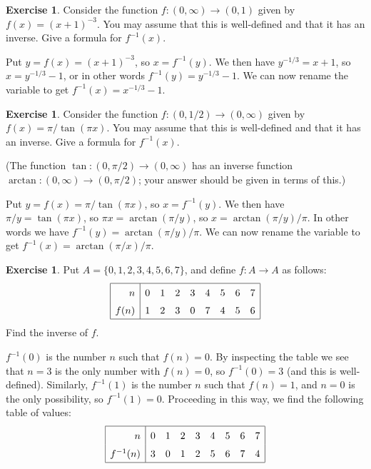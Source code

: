 \documentclass[a4paper]{book}
\newcommand{\xra}       {\xrightarrow}
\renewcommand{\:}{\colon}
\theoremstyle{definition}
\newtheorem{exercise}[theorem]{Exercise}
\renewenvironment{solution}{\SolutionInline}{\endSolutionInline}
\begin{document}
\begin{exercise}
 Consider the function $f\:(0,\infty)\xra{}(0,1)$ given by
 $f(x)=(x+1)^{-3}$.  You may assume that this is well-defined and that
 it has an inverse.  Give a formula for $f^{-1}(x)$.
\end{exercise}
\begin{solution}
 Put $y=f(x)=(x+1)^{-3}$, so $x=f^{-1}(y)$.  We then have
 $y^{-1/3}=x+1$, so $x=y^{-1/3}-1$, or in other words
 $f^{-1}(y)=y^{-1/3}-1$.  We can now rename the variable to get
 $f^{-1}(x)=x^{-1/3}-1$. 
\end{solution}
\begin{exercise}
 Consider the function $f\:(0,1/2)\xra{}(0,\infty)$ given by
 $f(x)=\pi/\tan(\pi x)$.  You may assume that this is well-defined and
 that it has an inverse.  Give a formula for $f^{-1}(x)$.

 (The function $\tan\:(0,\pi/2)\xra{}(0,\infty)$ has an inverse
 function $\arctan\:(0,\infty)\xra{}(0,\pi/2)$; your answer should be
 given in terms of this.)
\end{exercise}
\begin{solution}
 Put $y=f(x)=\pi/\tan(\pi x)$, so $x=f^{-1}(y)$.  We then have
 $\pi/y=\tan(\pi x)$, so $\pi x=\arctan(\pi/y)$, so
 $x=\arctan(\pi/y)/\pi$.  In other words we have
 $f^{-1}(y)=\arctan(\pi/y)/\pi$.  We can now rename the variable to
 get $f^{-1}(x)=\arctan(\pi/x)/\pi$.
\end{solution} 

\begin{exercise}
 Put $A=\{0,1,2,3,4,5,6,7\}$, and define $f\:A\xra{}A$ as follows:
 \[ \renewcommand{\arraystretch}{1.5} \begin{array}{|r|cccccccc|} 
   \hline
   n    & 0 & 1 & 2 & 3 & 4 & 5 & 6 & 7 \\
   f(n) & 1 & 2 & 3 & 0 & 7 & 4 & 5 & 6 \\
   \hline
 \end{array} \]
 Find the inverse of $f$.
\end{exercise}
\begin{solution}
 $f^{-1}(0)$ is the number $n$ such that $f(n)=0$.  By inspecting the
 table we see that $n=3$ is the only number with $f(n)=0$, so
 $f^{-1}(0)=3$ (and this is well-defined).  Similarly, $f^{-1}(1)$ is
 the number $n$ such that $f(n)=1$, and $n=0$ is the only possibility,
 so $f^{-1}(1)=0$.  Proceeding in this way, we find the following
 table of values:
 \[ \renewcommand{\arraystretch}{1.5} \begin{array}{|r|cccccccc|} 
   \hline
   n         & 0 & 1 & 2 & 3 & 4 & 5 & 6 & 7 \\
   f^{-1}(n) & 3 & 0 & 1 & 2 & 5 & 6 & 7 & 4 \\
   \hline
 \end{array} \]
\end{solution}
\end{document}
